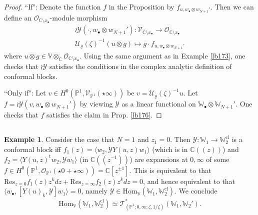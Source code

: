 \documentclass[12pt,a4paper,notitlepage]{article}
\theoremstyle{definition}
\newtheorem{eg}[df]{Example}
\theoremstyle{plain}
\newcommand{\mc}{\mathcal}
\newcommand{\tr}{\mathrm{t}} %
\newcommand{\Hom}{\mathrm{Hom}}
\newcommand{\Res}{\mathrm{Res}}
\newcommand{\bk}[1]{\langle {#1}\rangle}
\newcommand{\scr}{\mathscr}
\newcommand{\blt}{\bullet}
\newcommand{\Vbb}{\mathbb V}
\newcommand{\Wbb}{\mathbb W}
\newcommand{\Cbb}{\mathbb C}
\newcommand{\Pbb}{\mathbb P}
\newcommand{\cl}{\mathrm{cl}}
\numberwithin{equation}{section}
\begin{document}
\begin{proof}
``If": Denote the function $f$ in the Proposition by $f_{u,w_\blt\otimes w_{N+1}'}$. Then we can define an $\scr O_{\Cbb\setminus x_\blt}$-module morphism
\begin{gather*}
\wr\mc Y(\cdot,w_\blt\otimes w_{N+1}'):\scr V_{\Cbb\setminus x_\blt}\rightarrow\scr O_{\Cbb\setminus x_\blt}\\
\mc U_\varrho(\zeta)^{-1}(u\otimes g)\mapsto g\cdot f_{u,w_\blt\otimes w_{N+1}'}
\end{gather*}
where $u\otimes g\in \Vbb\otimes_\Cbb\scr O_{\Cbb\setminus x_\blt}$. Using the same argument as in Example \ref{lb173}, one checks that $\wr\mc Y$ satisfies the conditions in the complex analytic definition of conformal blocks.

``Only if": Let $v\in H^0(\Pbb^1,\scr V_{\Pbb^1}(\star\infty))$ be $v=\mc U_\varrho(\zeta)^{-1}u$. Let $f=\wr\mc Y(v,w_\blt\otimes w_{N+1}')$ by viewing $\mc Y$ as a linear functional on $\Wbb_\blt\otimes\Wbb_{N+1}'$. One checks that $f$  satisfies the claim in Prop. \ref{lb176}.
\end{proof}








\subsection{}





\begin{eg}\label{lb179}
Consider the case that $N=1$ and $z_1=0$. Then $\mc Y:\Wbb_1\rightarrow\Wbb_2^\cl$ is a conformal block iff $f_1(z)=\bk{w_2,\mc YY(u,z)w_1}$ (which is in $\Cbb((z))$) and $f_2=\bk{Y(u,z)^\tr w_2,\mc Yw_1}$ (in $\Cbb((z^{-1}))$) are expansions at $0,\infty$ of some $f\in H^0(\Pbb^1,\scr O_{\Pbb^1}(\star0+\star\infty))=\Cbb[z^{\pm1}]$. This is equivalent to that  $\Res_{z=0} f_1(z)z^kdz+\Res_{z=\infty}f_2(z)z^kdz=0$, and hence equivalent to that $\bk{w_\blt,[Y(u)_k,\mc Y]w_1}=0$, namely $\mc Y\in\Hom_\Vbb(\Wbb_1,\Wbb_2^\cl)$. We conclude
\begin{align}
\Hom_\Vbb(\Wbb_1,\Wbb_2^\cl)\simeq\scr T_{(\Pbb^1;0,\infty;\zeta,1/\zeta)}^*(\Wbb_1,\Wbb_2').
\end{align} 
\hfill\qedsymbol
\end{eg}
\end{document}
